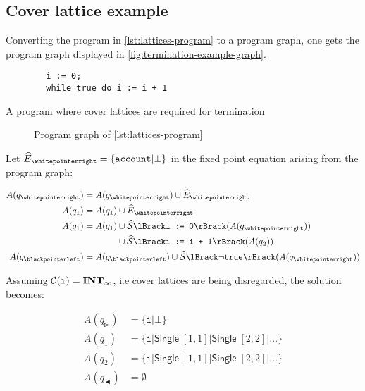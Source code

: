 \subsection{Cover lattice example}\label{subsec:cover-lattice-example}

Converting the program in \autoref{lst:lattices-program} to a program graph, one gets the program graph displayed in \autoref{fig:termination-example-graph}.

\begin{listing}
    \begin{verbatim}
        i := 0;
        while true do i := i + 1
    \end{verbatim}
    \caption{A program where cover lattices are required for termination}
    \label{lst:lattices-program}
\end{listing}

\begin{figure}
    \centering
    
    \caption{Program graph of \autoref{lst:lattices-program}}
    \label{fig:termination-example-graph}
\end{figure}

Let $\ab{E}_\whitepointerright = \{ \texttt{account} | \bot \}$ in the fixed point equation arising from the program graph:

\begin{align}
    A(q_\whitepointerright) &= A(q_\whitepointerright) \cup \ab{E}_\whitepointerright \\
    A(q_1) &= A(q_1) \cup \ab{E}_\whitepointerright \\
    A(q_1) &= \begin{aligned}[t]
        A(q_1) &\cup \abssem{\texttt{i := 0}}(A(q_\whitepointerright)) \\
        &\cup \abssem{\texttt{i := i + 1}}(A(q_2))
    \end{aligned} \\
    A(q_\blackpointerleft) &= A(q_\blackpointerleft) \cup \abssem{\neg\texttt{true}}(A(q_\whitepointerright))
\end{align}

Assuming $\mathcal{C}(\texttt{i}) = \mathbf{INT}_{\infty}$, i.e cover lattices are being disregarded, the solution becomes:

\begin{align}
    A(q_\whitepointerright) &= \{ \texttt{i} | \bot \} \\
    A(q_1) &= \{ \texttt{i} | \mathsf{Single} \; [1, 1] | \mathsf{Single} \; [2, 2] | \dots \} \\
    A(q_2) &= \{ \texttt{i} | \mathsf{Single} \; [1, 1] | \mathsf{Single} \; [2, 2] | \dots \} \\
    A(q_\blackpointerleft) &= \emptyset
\end{align}

